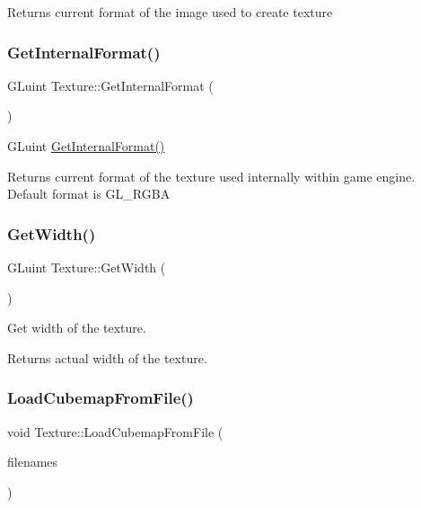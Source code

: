 Returns current format of the image used to create texture \mbox{\label{class_texture_a8a45061cc3ef1c5de2ac8a0977658de1}} 
\subsubsection{\texorpdfstring{GetInternalFormat()}{GetInternalFormat()}}
{\footnotesize\ttfamily G\+Luint Texture\+::\+Get\+Internal\+Format (\begin{DoxyParamCaption}{ }\end{DoxyParamCaption})}



G\+Luint \mbox{\hyperlink{class_texture_a8a45061cc3ef1c5de2ac8a0977658de1}{Get\+Internal\+Format()}} 

Returns current format of the texture used internally within game engine. Default format is G\+L\+\_\+\+R\+G\+BA \mbox{\label{class_texture_af1186a3204c49bf2a8cd09550299b0c9}} 
\subsubsection{\texorpdfstring{GetWidth()}{GetWidth()}}
{\footnotesize\ttfamily G\+Luint Texture\+::\+Get\+Width (\begin{DoxyParamCaption}{ }\end{DoxyParamCaption})}



Get width of the texture. 

Returns actual width of the texture. \mbox{\label{class_texture_a056053b6bb3b6ed3bb44a624f0fb62c7}} 
\subsubsection{\texorpdfstring{LoadCubemapFromFile()}{LoadCubemapFromFile()}}
{\footnotesize\ttfamily void Texture\+::\+Load\+Cubemap\+From\+File (\begin{DoxyParamCaption}\item[{std\+::vector$<$ G\+Lchar $\ast$ $>$}]{filenames }\end{DoxyParamCaption})}



